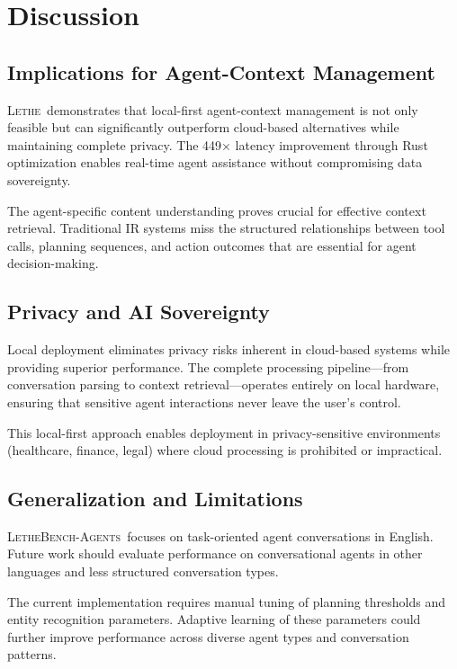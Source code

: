 \documentclass[letterpaper]{article}
\newcommand{\lethe}{\textsc{Lethe}}
\newcommand{\lethebench}{\textsc{LetheBench-Agents}}
\begin{document}
\section{Discussion}

\subsection{Implications for Agent-Context Management}

\lethe\ demonstrates that local-first agent-context management is not only feasible but can significantly outperform cloud-based alternatives while maintaining complete privacy. The 449× latency improvement through Rust optimization enables real-time agent assistance without compromising data sovereignty.

The agent-specific content understanding proves crucial for effective context retrieval. Traditional IR systems miss the structured relationships between tool calls, planning sequences, and action outcomes that are essential for agent decision-making.

\subsection{Privacy and AI Sovereignty}

Local deployment eliminates privacy risks inherent in cloud-based systems while providing superior performance. The complete processing pipeline—from conversation parsing to context retrieval—operates entirely on local hardware, ensuring that sensitive agent interactions never leave the user's control.

This local-first approach enables deployment in privacy-sensitive environments (healthcare, finance, legal) where cloud processing is prohibited or impractical.

\subsection{Generalization and Limitations}

\lethebench\ focuses on task-oriented agent conversations in English. Future work should evaluate performance on conversational agents in other languages and less structured conversation types.

The current implementation requires manual tuning of planning thresholds and entity recognition parameters. Adaptive learning of these parameters could further improve performance across diverse agent types and conversation patterns.
\end{document}
